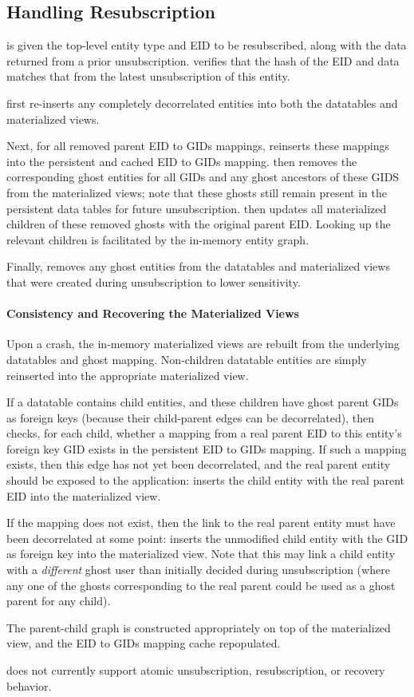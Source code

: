 \subsection{Handling Resubscription}
\sys{} is given the top-level entity type and EID to be resubscribed, along with the data returned
from a prior unsubscription.
\sys{} verifies that the hash of the EID and data matches that from the latest unsubscription of
this entity.

\sys{} first re-inserts any completely
decorrelated entities into both the datatables and materialized views. 

Next, for all removed parent EID to GIDs mappings, \sys{} reinserts these mappings into the
persistent and cached EID to GIDs mapping.
\sys{} then removes the corresponding ghost entities for all GIDs and any ghost ancestors of these
GIDS from the materialized views; note that these ghosts still remain present in the
persistent data tables for future unsubscription.
\sys{} then updates all materialized children of these removed ghosts with the original parent EID. Looking up the relevant
children is facilitated by the in-memory entity graph. 

Finally, \sys{} removes any
ghost entities from the datatables and materialized views that were created during unsubscription to
lower sensitivity.

\paragraph{Consistency and Recovering the Materialized Views}
Upon a crash, the in-memory materialized views are rebuilt from the underlying datatables and ghost
mapping. Non-children datatable entities are simply reinserted into the appropriate
materialized view. 

If a datatable contains child entities, and these children have ghost parent GIDs as foreign
keys (because their child-parent edges can be decorrelated), then \sys{} checks, for each child, whether a mapping
from a real parent EID to this entity's foreign key GID exists in the persistent EID to GIDs
mapping. If such a mapping exists, then this edge has not yet been decorrelated, and the real parent
entity should be exposed to the application: \sys{} inserts the child entity with the real parent
EID into the materialized view.

If the mapping does not exist, then the link to the real parent entity must have been decorrelated at some point:
\sys{} inserts the unmodified child entity with the GID as foreign key into the materialized view.
Note that this may link a child entity with a \emph{different} ghost user than initially decided
during unsubscription (where any one of the ghosts corresponding to the real parent could be used as
a ghost parent for any child). 

The parent-child graph is constructed appropriately on top of the materialized view, and the EID to
GIDs mapping cache repopulated.

\sys{} does not currently support atomic unsubscription, resubscription, or recovery behavior.

